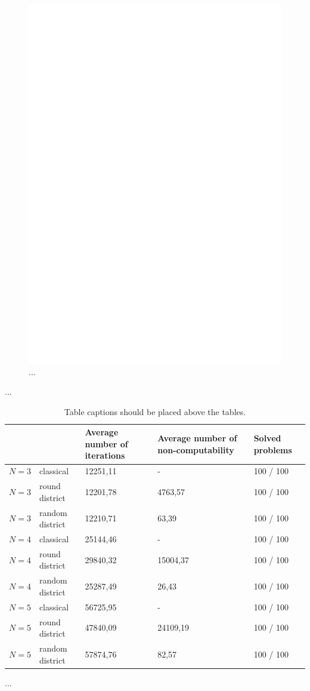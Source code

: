 \documentclass[runningheads]{llncs}
\begin{document}
\begin{figure}
\includegraphics[width=\textwidth]{fig1.pdf}
\caption{...} \label{fig6}
\end{figure}
...
\begin{table}
\caption{Table captions should be placed above the
tables.}\label{tab1}
\begin{tabular}{|l|l|l|l|l|}
\hline
 &  & Average number of iterations & Average number of non-computability & Solved problems \\
\hline
$N=3$ & classical & 12251,11 & - & 100 / 100 \\
$N=3$ & round district & 12201,78 & 4763,57 & 100 / 100 \\
$N=3$ & random district & 12210,71 & 63,39 & 100 / 100 \\
$N=4$ & classical & 25144,46 & - & 100 / 100 \\
$N=4$ & round district & 29840,32 & 15004,37  & 100 / 100 \\
$N=4$ & random district & 25287,49 & 26,43 & 100 / 100 \\
$N=5$ & classical & 56725,95 & - & 100 / 100 \\
$N=5$ & round district & 47840,09 & 24109,19 & 100 / 100\\
$N=5$ & random district & 57874,76 & 82,57 & 100 / 100\\
\hline
\end{tabular}
\end{table}
...
\end{document}
